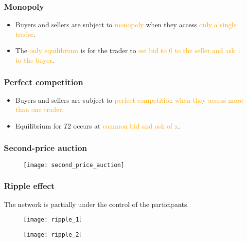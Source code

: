 \subsubsection{Monopoly}

\begin{itemize}
\item Buyers and sellers are subject to \textcolor{orange}{monopoly} when they access \textcolor{orange}{only a single trader}.
\item The \textcolor{orange}{only equilibrium} is for the trader to \textcolor{orange}{set bid to $0$ to the seller and ask $1$ to the buyer}.
\end{itemize}

\subsubsection{Perfect competition}

\begin{itemize}
\item Buyers and sellers are subject to \textcolor{orange}{perfect competition when they access more than one trader}.
\item Equilibrium for $T2$ occurs at \textcolor{orange}{common bid and ask of x}.
\end{itemize}

\subsubsection{Second-price auction}

\begin{figure}[H]
    \centering
    \texttt{[image: second\_price\_auction]}
\end{figure}

\newpage
\subsubsection{Ripple effect}

The network is partially under the control of the participants.

\begin{figure}[H]
    \centering
    \texttt{[image: ripple\_1]}
\end{figure}

\begin{figure}[H]
    \centering
    \texttt{[image: ripple\_2]}
\end{figure}

